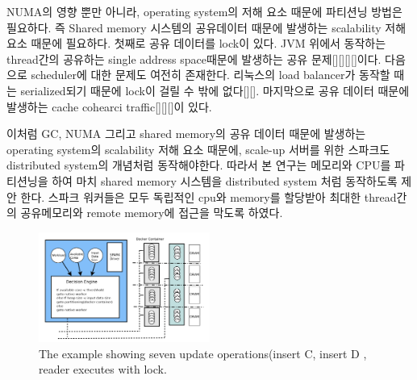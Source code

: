 \ifkor
NUMA의 영향 뿐만 아니라, operating system의 저해 요소 때문에 
파티션닝 방법은 필요하다.
즉 Shared memory 시스템의 공유데이터 때문에 발생하는 scalability 저해 요소 때문에 필요하다.
첫째로 공유 데이터를 lock이 있다.
JVM 위에서 동작하는 thread간의 공유하는 single address space때문에 발생하는 공유 문제[][][][]이다.
다음으로 scheduler에 대한 문제도 여전히 존재한다. 리눅스의 load balancer가 동작할 때는
serialized되기 때문에 lock이 걸릴 수 밖에 없다[][].
마지막으로 공유 데이터 때문에 발생하는 cache cohearci traffic[][][]이 있다. 
\else

\fi

\ifkor
이처럼 GC, NUMA 그리고 shared memory의 공유 데이터 때문에 발생하는 operating system의
scalability 저해 요소 때문에, scale-up 서버를 위한 스파크도 distributed system의 개념처럼 
동작해야한다.
따라서 본 연구는 메모리와 CPU를 파티션닝을 하여 마치 shared memory 시스템을 distributed system 
처럼 동작하도록 제안 한다.
스파크 워커들은 모두 독립적인 cpu와 memory를 할당받아 최대한 thread간의 공유메모리와 remote
memory에 접근을 막도록 하였다.
\else

\fi

\begin{figure}[h]
  \begin{center}
     \includegraphics[width=0.5\textwidth]{fig/jaildocker}
  \end{center}
  \caption{The example showing seven update operations(insert C, insert D ,
  reader executes with lock.}
  \label{fig:basic}
\end{figure}


